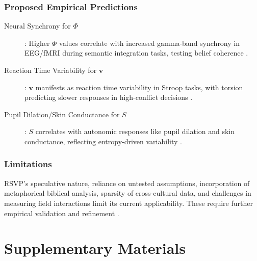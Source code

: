 \documentclass[12pt]{report}
\newcommand{\PhiRSVP}{\Phi}
\newcommand{\vRSVP}{\mathbf{v}}
\newcommand{\SRSVP}{S}
\begin{document}
\section{Proposed Empirical Predictions}
\begin{description}
    \item[Neural Synchrony for \(\PhiRSVP\)]: Higher \(\PhiRSVP\) values correlate with increased gamma-band synchrony in EEG/fMRI during semantic integration tasks, testing belief coherence \citep{Fries2005}.
    \item[Reaction Time Variability for \(\vRSVP\)]: \(\vRSVP\) manifests as reaction time variability in Stroop tasks, with torsion predicting slower responses in high-conflict decisions \citep{SemanticField2025}.
    \item[Pupil Dilation/Skin Conductance for \(\SRSVP\)]: \(\SRSVP\) correlates with autonomic responses like pupil dilation and skin conductance, reflecting entropy-driven variability \citep{SemanticField2025}.
\end{description}

\section{Limitations}
RSVP’s speculative nature, reliance on untested assumptions, incorporation of metaphorical biblical analysis, sparsity of cross-cultural data, and challenges in measuring field interactions limit its current applicability. These require further empirical validation and refinement \citep{RSVPMeta2025}.

\part{Supplementary Materials}
\end{document}
